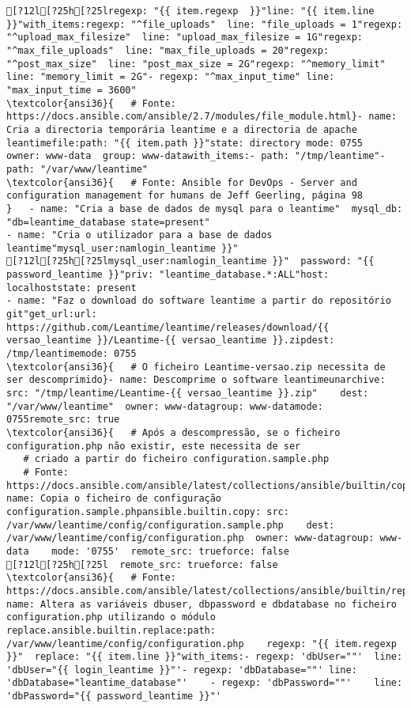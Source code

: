 \documentclass{scrartcl}
\begin{document}
\begin{Verbatim}
[?12l[?25h[?25lregexp: "{{ item.regexp  }}"line: "{{ item.line }}"with_items:regexp: "^file_uploads"  line: "file_uploads = 1"regexp: "^upload_max_filesize"  line: "upload_max_filesize = 1G"regexp: "^max_file_uploads"  line: "max_file_uploads = 20"regexp: "^post_max_size"  line: "post_max_size = 2G"regexp: "^memory_limit"  line: "memory_limit = 2G"- regexp: "^max_input_time" line: "max_input_time = 3600"
\textcolor{ansi36}{   # Fonte: https://docs.ansible.com/ansible/2.7/modules/file_module.html}- name: Cria a directoria temporária leantime e a directoria de apache leantimefile:path: "{{ item.path }}"state: directory mode: 0755    owner: www-data  group: www-datawith_items:- path: "/tmp/leantime"- path: "/var/www/leantime"
\textcolor{ansi36}{   # Fonte: Ansible for DevOps - Server and configuration management for humans de Jeff Geerling, página 98
}   - name: "Cria a base de dados de mysql para o leantime"  mysql_db: "db=leantime_database state=present"
- name: "Cria o utilizador para a base de dados leantime"mysql_user:namlogin_leantime }}"
[?12l[?25h[?25lmysql_user:namlogin_leantime }}"  password: "{{ password_leantime }}"priv: "leantime_database.*:ALL"host: localhoststate: present
- name: "Faz o download do software leantime a partir do repositório git"get_url:url: https://github.com/Leantime/leantime/releases/download/{{ versao_leantime }}/Leantime-{{ versao_leantime }}.zipdest: /tmp/leantimemode: 0755
\textcolor{ansi36}{   # O ficheiro Leantime-versao.zip necessita de ser descomprimido}- name: Descomprime o software leantimeunarchive: src: "/tmp/leantime/Leantime-{{ versao_leantime }}.zip"    dest: "/var/www/leantime"  owner: www-datagroup: www-datamode: 0755remote_src: true
\textcolor{ansi36}{   # Após a descompressão, se o ficheiro configuration.php não existir, este necessita de ser
   # criado a partir do ficheiro configuration.sample.php
   # Fonte: https://docs.ansible.com/ansible/latest/collections/ansible/builtin/copy_module.html}- name: Copia o ficheiro de configuração configuration.sample.phpansible.builtin.copy: src: /var/www/leantime/config/configuration.sample.php    dest: /var/www/leantime/config/configuration.php  owner: www-datagroup: www-data    mode: '0755'  remote_src: trueforce: false
[?12l[?25h[?25l  remote_src: trueforce: false
\textcolor{ansi36}{   # Fonte: https://docs.ansible.com/ansible/latest/collections/ansible/builtin/replace_module.html}- name: Altera as variáveis dbuser, dbpassword e dbdatabase no ficheiro configuration.php utilizando o módulo replace.ansible.builtin.replace:path: /var/www/leantime/config/configuration.php    regexp: "{{ item.regexp  }}"  replace: "{{ item.line }}"with_items:- regexp: 'dbUser=""'  line: 'dbUser="{{ login_leantime }}"'- regexp: 'dbDatabase=""' line: 'dbDatabase="leantime_database"'    - regexp: 'dbPassword=""'    line: 'dbPassword="{{ password_leantime }}"'

\end{Verbatim}
\end{document}
